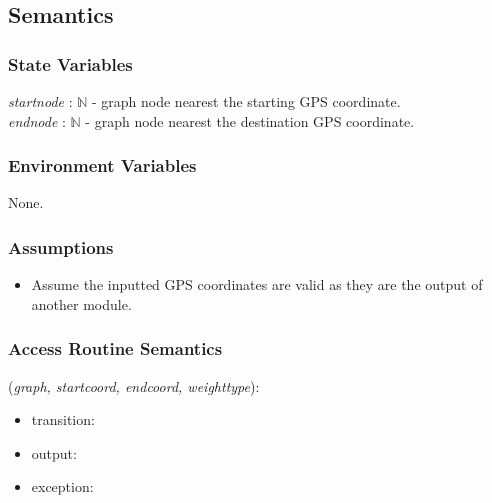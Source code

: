 \documentclass[12pt, titlepage]{article}
\begin{document}
\subsection{Semantics}

\subsubsection{State Variables}

\emph{startnode} : $\mathbb{N}$ - graph node nearest the starting GPS coordinate.\\
\emph{endnode} : $\mathbb{N}$ - graph node nearest the destination GPS coordinate.

\subsubsection{Environment Variables}

None.

\subsubsection{Assumptions}

\begin{itemize}
    \item Assume the inputted GPS coordinates are valid as they are the output of another module.
\end{itemize}

\subsubsection{Access Routine Semantics}

\noindent {}(\emph{graph, startcoord, endcoord, weighttype}):
\begin{itemize}
\item transition:  
\item output:  
\item exception:  
\end{itemize}
\end{document}
